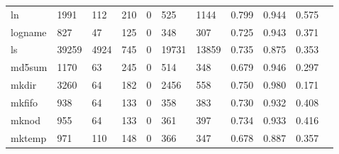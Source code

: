 \begin{longtable}{lp{1.10cm}p{1.10cm}p{1.10cm}p{1.10cm}p{1.10cm}p{1.10cm}p{1.10cm}p{1.10cm}p{1.10cm}p{1.10cm}}
ln        &                   1991 &                                112 &                               210 &                                0 &                               525 &                            1144 &                             0.799 &                                 0.944 &                               0.575 \\
logname   &                    827 &                                 47 &                               125 &                                0 &                               348 &                             307 &                             0.725 &                                 0.943 &                               0.371 \\
ls        &                  39259 &                               4924 &                               745 &                                0 &                             19731 &                           13859 &                             0.735 &                                 0.875 &                               0.353 \\
md5sum    &                   1170 &                                 63 &                               245 &                                0 &                               514 &                             348 &                             0.679 &                                 0.946 &                               0.297 \\
mkdir     &                   3260 &                                 64 &                               182 &                                0 &                              2456 &                             558 &                             0.750 &                                 0.980 &                               0.171 \\
mkfifo    &                    938 &                                 64 &                               133 &                                0 &                               358 &                             383 &                             0.730 &                                 0.932 &                               0.408 \\
mknod     &                    955 &                                 64 &                               133 &                                0 &                               361 &                             397 &                             0.734 &                                 0.933 &                               0.416 \\
mktemp    &                    971 &                                110 &                               148 &                                0 &                               366 &                             347 &                             0.678 &                                 0.887 &                               0.357 \\

\end{longtable}
